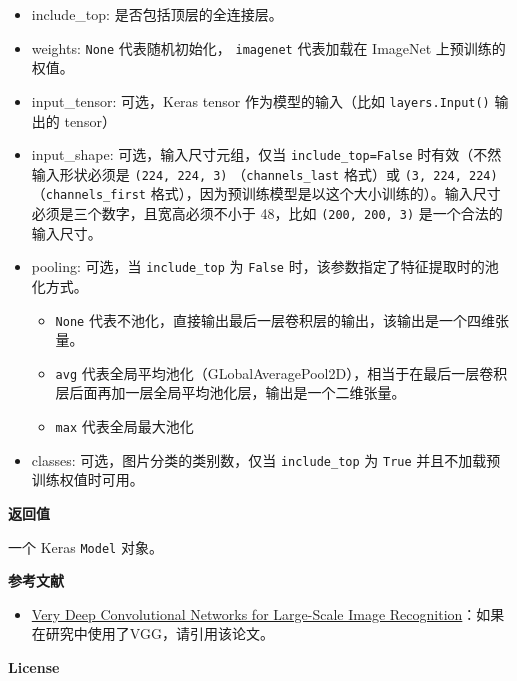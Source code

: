 \begin{itemize}
\tightlist
\item
  include\_top: 是否包括顶层的全连接层。
\item
  weights: \texttt{None} 代表随机初始化，
  \texttt{\textquotesingle{}imagenet\textquotesingle{}} 代表加载在
  ImageNet 上预训练的权值。
\item
  input\_tensor: 可选，Keras tensor 作为模型的输入（比如
  \texttt{layers.Input()} 输出的 tensor）
\item
  input\_shape: 可选，输入尺寸元组，仅当 \texttt{include\_top=False}
  时有效（不然输入形状必须是 \texttt{(224,\ 224,\ 3)}
  （\texttt{channels\_last} 格式）或 \texttt{(3,\ 224,\ 224)}
  （\texttt{channels\_first}
  格式），因为预训练模型是以这个大小训练的）。输入尺寸必须是三个数字，且宽高必须不小于
  48，比如 \texttt{(200,\ 200,\ 3)} 是一个合法的输入尺寸。
\item
  pooling: 可选，当 \texttt{include\_top} 为 \texttt{False}
  时，该参数指定了特征提取时的池化方式。

  \begin{itemize}
  \tightlist
  \item
    \texttt{None}
    代表不池化，直接输出最后一层卷积层的输出，该输出是一个四维张量。
  \item
    \texttt{\textquotesingle{}avg\textquotesingle{}}
    代表全局平均池化（GLobalAveragePool2D），相当于在最后一层卷积层后面再加一层全局平均池化层，输出是一个二维张量。
  \item
    \texttt{\textquotesingle{}max\textquotesingle{}} 代表全局最大池化
  \end{itemize}
\item
  classes: 可选，图片分类的类别数，仅当 \texttt{include\_top} 为
  \texttt{True} 并且不加载预训练权值时可用。
\end{itemize}

\textbf{返回值}\label{ux8fd4ux56deux503c-2}

一个 Keras \texttt{Model} 对象。

\textbf{参考文献}\label{ux53c2ux8003ux6587ux732e-2}

\begin{itemize}
\tightlist
\item
  \href{https://arxiv.org/abs/1409.1556}{Very Deep Convolutional
  Networks for Large-Scale Image
  Recognition}：如果在研究中使用了VGG，请引用该论文。
\end{itemize}

\textbf{License}\label{license-2}

